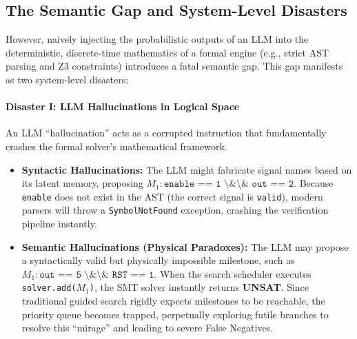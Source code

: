 \documentclass[conference]{IEEEtran}
\begin{document}
\subsection{The Semantic Gap and System-Level Disasters}
However, naively injecting the probabilistic outputs of an LLM into the deterministic, discrete-time mathematics of a formal engine (e.g., strict AST parsing and Z3 constraints) introduces a fatal semantic gap. This gap manifests as two system-level disasters:

\paragraph{Disaster I: LLM Hallucinations in Logical Space}
An LLM ``hallucination'' acts as a corrupted instruction that fundamentally crashes the formal solver's mathematical framework.
\begin{itemize}
    \item \textbf{Syntactic Hallucinations:} The LLM might fabricate signal names based on its latent memory, proposing $M_1: \texttt{enable == 1 \char`\&\char`\& out == 2}$. Because \texttt{enable} does not exist in the AST (the correct signal is \texttt{valid}), modern parsers will throw a \texttt{SymbolNotFound} exception, crashing the verification pipeline instantly.
    \item \textbf{Semantic Hallucinations (Physical Paradoxes):} The LLM may propose a syntactically valid but physically impossible milestone, such as $M_1: \texttt{out == 5 \char`\&\char`\& RST == 1}$. When the search scheduler executes \texttt{solver.add($M_1$)}, the SMT solver instantly returns \textbf{UNSAT}. Since traditional guided search rigidly expects milestones to be reachable, the priority queue becomes trapped, perpetually exploring futile branches to resolve this ``mirage'' and leading to severe False Negatives.
\end{itemize}
\end{document}
